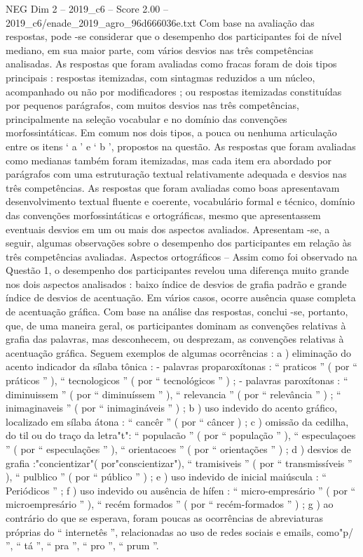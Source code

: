 \begin{textsample}{NEG Dim 2 – 2019\_c6 – Score 2.00 – 2019\_c6/enade\_2019\_agro\_96d666036e.txt}
Com base na avaliação das respostas, pode -se considerar que o desempenho dos participantes foi de nível mediano, em sua maior parte, com vários desvios nas três competências analisadas.
As respostas que foram avaliadas como fracas foram de dois tipos principais : respostas itemizadas, com sintagmas reduzidos a um núcleo, acompanhado ou não por modificadores ; ou respostas itemizadas constituídas por pequenos parágrafos, com muitos desvios nas três competências, principalmente na seleção vocabular e no domínio das convenções morfossintáticas.
Em comum nos dois tipos, a pouca ou nenhuma articulação entre os itens ‘ a ’ e ‘ b ’, propostos na questão.
As respostas que foram avaliadas como medianas também foram itemizadas, mas cada item era abordado por parágrafos com uma estruturação textual relativamente adequada e desvios nas três competências.
As respostas que foram avaliadas como boas apresentavam desenvolvimento textual fluente e coerente, vocabulário formal e técnico, domínio das convenções morfossintáticas e ortográficas, mesmo que apresentassem eventuais desvios em um ou mais dos aspectos avaliados.
Apresentam -se, a seguir, algumas observações sobre o desempenho dos participantes em relação às três competências avaliadas.
Aspectos ortográficos – Assim como foi observado na Questão 1, o desempenho dos participantes revelou uma diferença muito grande nos dois aspectos analisados : baixo índice de desvios de grafia padrão e grande índice de desvios de acentuação.
Em vários casos, ocorre ausência quase completa de acentuação gráfica.
Com base na análise das respostas, conclui -se, portanto, que, de uma maneira geral, os participantes dominam as convenções relativas à grafia das palavras, mas desconhecem, ou desprezam, as convenções relativas à acentuação gráfica.
Seguem exemplos de algumas ocorrências : a ) eliminação do acento indicador da sílaba tônica : - palavras proparoxítonas : “ praticos ” ( por “ práticos ” ), “ tecnologicos ” ( por “ tecnológicos ” ) ; - palavras paroxítonas : “ diminuissem ” ( por “ diminuíssem ” ), “ relevancia ” ( por “ relevância ” ) ; “ inimaginaveis ” ( por “ inimagináveis ” ) ; b ) uso indevido do acento gráfico, localizado em sílaba átona : “ cancêr ” ( por “ câncer ) ; c ) omissão da cedilha, do til ou do traço da letra"t": “ populacão ” ( por “ população ” ), “ especulaçoes ” ( por “ especulações ” ), “ orientacoes ” ( por “ orientações ” ) ; d ) desvios de grafia :"concientizar"( por"conscientizar"), “ tramisiveis ” ( por “ transmissíveis ” ), “ pulblico ” ( por “ público ” ) ; e ) uso indevido de inicial maiúscula : “ Periódicos ” ; f ) uso indevido ou ausência de hífen : “ micro-empresário ” ( por “ microempresário ” ), “ recém formados ” ( por “ recém-formados ” ) ; g ) ao contrário do que se esperava, foram poucas as ocorrências de abreviaturas próprias do “ internetês ”, relacionadas ao uso de redes sociais e emails, como"p/ ”, “ tá ”, “ pra ”, “ pro ”, “ prum ”.

\end{textsample}
